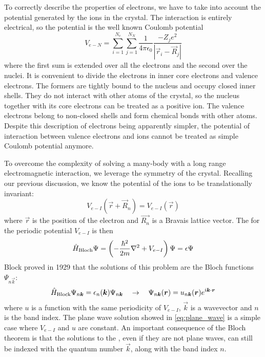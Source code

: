 To correctly describe the properties of electrons, we have to take into account the potential generated by the ions in the crystal. The interaction is entirely electrical, so the potential is the well known Coulomb potential
\begin{equation}
    V_{e-N} = \sum_{i=1}^{N_e} \sum_{j=1}^{N_N} \frac{1}{4\pi\epsilon_0} \frac{-Z_je^2}{|\vec{r}_i - \vec{R}_j|}
\end{equation}
where the first sum is extended over all the electrons and the second over the nuclei. It is convenient to divide the electrons in inner core electrons and valence electrons. The formers are tightly bound to the nucleus and occupy closed inner shells. They do not interact with other atoms of the crystal, so the nucleus together with its core electrons can be treated as a positive ion. The valence electrons belong to  non-closed shells and form chemical bonds with other atoms. Despite this description of electrons being apparently simpler, the potential of interaction between valence electrons and ions cannot be treated as simple Coulomb potential anymore.

To overcome the complexity of solving a many-body \sche   with a long range electromagnetic interaction, we leverage the symmetry of the crystal. Recalling our previous discussion, we know the potential of the ions to be translationally invariant:
\begin{equation}
    V_{e-I}(\vec{r}+\vec{R}_n) = V_{e-I}(\vec{r})
\end{equation}
where $\vec{r}$ is the position of the electron and $\vec{R_n}$ is a Bravais lattice vector.
The \sche for the periodic potential $V_{e-I}$ is then
\begin{equation}
    \oper{H}_\text{Bloch} \Psi = \left(-\frac{\hbar^2}{2m} \laplacian + V_{e-I} \right)\Psi = \epsilon\Psi
\end{equation}
Block proved in 1929 \cite{bloch1929} that the solutions of this problem are the Bloch functions $\Psi_{n\vec{k}}$:
\begin{equation}
    \hat{H}_\text{Block} \Psi_{n\mathbf{\boldsymbol{k}}} = \epsilon_n(\mathbf{\boldsymbol{k}}) \Psi_{n\mathbf{\boldsymbol{k}}}
    \quad
    \rightarrow
    \quad
    \Psi_{n\mathbf{\boldsymbol{k}}}(\mathbf{\boldsymbol{r}}) = u_{n\mathbf{\boldsymbol{k}}}(\mathbf{\boldsymbol{r}}) e^{i\mathbf{\boldsymbol{k}}\cdot\mathbf{\boldsymbol{r}}}
\end{equation}
where $u$ is a function with the same periodicity of $V_{e-I}$, $\vec{k}$ is a wavevector and $n$ is the band index. The plane wave solution showed in \cref{eq:plane_wave} is a simple case where $V_{e-I}$ and $u$ are constant. An important consequence of the Bloch theorem is that the solutions to the \sche, even if they are not plane waves, can still be indexed with the quantum number $\vec{k}$, along with the band index $n$.

